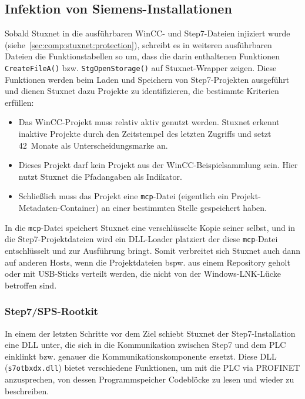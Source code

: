 \subsection{Infektion von Siemens-Installationen}

Sobald Stuxnet in die ausführbaren WinCC- und Step7-Dateien injiziert
wurde (siehe~\ref{sec:comp:stuxnet:protection}), schreibt es in
weiteren ausführbaren Dateien die Funktionstabellen so um, dass die
darin enthaltenen Funktionen \texttt{CreateFileA()}
bzw. \texttt{StgOpenStorage()} auf Stuxnet-Wrapper zeigen. Diese
Funktionen werden beim Laden und Speichern von Step7-Projekten
ausgeführt und dienen Stuxnet dazu Projekte zu identifizieren, die
bestimmte Kriterien erfüllen:

\begin{itemize}
  \item Das WinCC-Projekt muss relativ aktiv genutzt werden. Stuxnet
erkennt inaktive Projekte durch den Zeitstempel des letzten Zugriffs
und setzt 42~Monate als Unterscheidungsmarke an.
  
  \item Dieses Projekt darf kein Projekt aus der
WinCC-Beispielsammlung sein.  Hier nutzt Stuxnet die Pfadangaben als
Indikator.
  
  \item Schließlich muss das Projekt eine \texttt{mcp}-Datei
(eigentlich ein Projekt-Metadaten-Container) an einer bestimmten
Stelle gespeichert haben.
\end{itemize}

In die \texttt{mcp}-Datei speichert Stuxnet eine verschlüsselte Kopie
seiner selbst, und in die Step7-Projektdateien wird ein DLL-Loader
platziert der diese \texttt{mcp}-Datei entschlüsselt und zur
Ausführung bringt. Somit verbreitet sich Stuxnet auch dann auf anderen
Hosts, wenn die Projektdateien bspw. aus einem Repository geholt oder
mit USB-Sticks verteilt werden, die nicht von der Windows-LNK-Lücke
betroffen sind.

\subsubsection{Step7/SPS-Rootkit}

In einem der letzten Schritte vor dem Ziel schiebt Stuxnet der
Step7-Installation eine DLL unter, die sich in die Kommunikation
zwischen Step7 und dem PLC einklinkt bzw. genauer die
Kommunikationskomponente ersetzt. Diese DLL (\texttt{s7otbxdx.dll})
bietet verschiedene Funktionen, um mit die PLC via PROFINET
anzusprechen, von dessen Programmspeicher Codeblöcke zu lesen und
wieder zu beschreiben.

